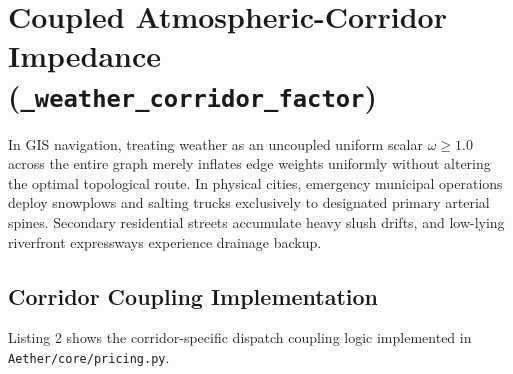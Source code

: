 \documentclass[10pt,a4paper]{article}
\begin{document}
\newpage
\section{Coupled Atmospheric-Corridor Impedance (\texttt{\_weather\_corridor\_factor})}

In GIS navigation, treating weather as an uncoupled uniform scalar $\omega \ge 1.0$ across the entire graph merely inflates edge weights uniformly without altering the optimal topological route.
In physical cities, emergency municipal operations deploy snowplows and salting trucks exclusively to designated primary arterial spines. Secondary residential streets accumulate heavy slush drifts, and low-lying riverfront expressways experience drainage backup.

\subsection{Corridor Coupling Implementation}
Listing 2 shows the corridor-specific dispatch coupling logic implemented in \texttt{Aether/core/pricing.py}.
\end{document}
